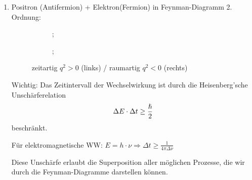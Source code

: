 \documentclass[Ex4_Zusammenfassung.tex]{subfiles}
\begin{document}
	\begin{enumerate}
		\item Positron (Antifermion) + Elektron(Fermion) in Feynman-Diagramm 2. Ordnung:
			\begin{figure}[H]
				\centering
					\quad
				\begin{subfigure}[b]{0.4\textwidth}
					;
				\end{subfigure}
				\quad
				\begin{subfigure}[b]{0.4\textwidth}
					;
				\end{subfigure}
				\caption{zeitartig $q^2 >0$ (links) / raumartig $q^2 < 0$ (rechts)}
			\end{figure}
			Wichtig: Das Zeitintervall der Wechselwirkung ist durch die Heisenberg'sche Unschärferelation
			\begin{equation}
				 \Delta E \cdot \Delta t \ge \frac{\hslash}{2}
			\end{equation}
			beschränkt.
			
			Für elektromagnetische WW: $E = h \cdot \nu \Rightarrow \Delta t \ge \frac{1}{4\pi \Delta \nu}$
			
			Diese Unschärfe erlaubt die Superposition aller möglichen Prozesse, die wir durch die Feynman-Diagramme darstellen können.


\end{enumerate}
\end{document}

